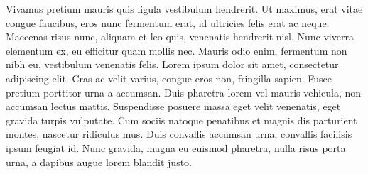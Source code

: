 Vivamus pretium mauris quis ligula vestibulum hendrerit. Ut maximus, erat vitae congue faucibus, eros nunc fermentum erat, id ultricies felis erat ac neque. Maecenas risus nunc, aliquam et leo quis, venenatis hendrerit nisl. Nunc viverra elementum ex, eu efficitur quam mollis nec. Mauris odio enim, fermentum non nibh eu, vestibulum venenatis felis. Lorem ipsum dolor sit amet, consectetur adipiscing elit. Cras ac velit varius, congue eros non, fringilla sapien. Fusce pretium porttitor urna a accumsan. Duis pharetra lorem vel mauris vehicula, non accumsan lectus mattis. Suspendisse posuere massa eget velit venenatis, eget gravida turpis vulputate. Cum sociis natoque penatibus et magnis dis parturient montes, nascetur ridiculus mus. Duis convallis accumsan urna, convallis facilisis ipsum feugiat id. Nunc gravida, magna eu euismod pharetra, nulla risus porta urna, a dapibus augue lorem blandit justo.
 